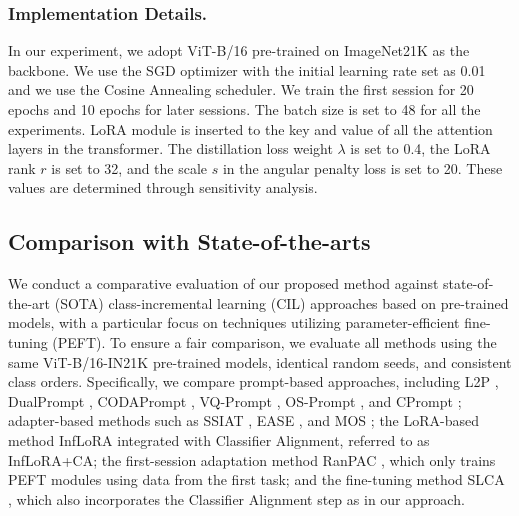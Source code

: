 \subsubsection{Implementation Details.}
In our experiment, we adopt ViT-B/16 \cite{dosovitskiy2021an} pre-trained on ImageNet21K \cite{russakovsky2015imagenet} as the backbone. We use the SGD optimizer with the initial learning rate set as 0.01 and we use the Cosine Annealing scheduler. We train the first session for 20 epochs and 10 epochs for later sessions. The batch size is set to 48 for all the experiments. LoRA module is inserted to the key and value of all the attention layers in the transformer. The distillation loss weight \( \lambda \) is set to 0.4, the LoRA rank \( r \) is set to 32, and the scale \( s \) in the angular penalty loss is set to 20. These values are determined through sensitivity analysis.


\subsection{Comparison with State-of-the-arts}

We conduct a comparative evaluation of our proposed method against state-of-the-art (SOTA) class-incremental learning (CIL) approaches based on pre-trained models, with a particular focus on techniques utilizing parameter-efficient fine-tuning (PEFT). To ensure a fair comparison, we evaluate all methods using the same ViT-B/16-IN21K pre-trained models, identical random seeds, and consistent class orders. Specifically, we compare prompt-based approaches, including L2P \cite{wang2022learning}, DualPrompt \cite{wang2022dualprompt}, CODAPrompt \cite{smith2023coda}, VQ-Prompt \cite{jiao2024vector}, OS-Prompt \cite{kim2024one}, and CPrompt \cite{gao2024consistent}; adapter-based methods such as SSIAT \cite{tan2024semantically}, EASE \cite{zhou2024expandable}, and MOS \cite{sun2024mos}; the LoRA-based method InfLoRA \cite{liang2024inflora} integrated with Classifier Alignment, referred to as InfLoRA+CA; the first-session adaptation method RanPAC \cite{mcdonnell2023ranpac}, which only trains PEFT modules using data from the first task; and the fine-tuning method SLCA \cite{zhang2023slca}, which also incorporates the Classifier Alignment step as in our approach. 

